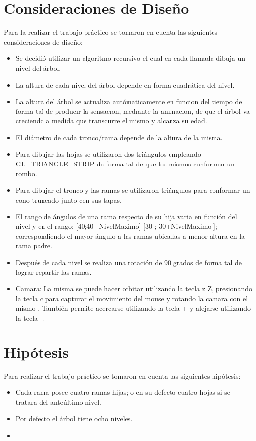 \documentclass[11pt]{article}
\begin{document}
\section{Consideraciones de Dise\~no}
  Para la realizar el trabajo pr\'actico se tomaron en cuenta las siguientes consideraciones de dise\~no:
\begin{itemize}
 \item Se decidi\'o utilizar un algoritmo recursivo el cual en cada llamada dibuja un nivel del \'arbol.
 \item La altura de cada nivel del \'arbol depende en forma cuadr\'atica del nivel.
 \item La altura del \'arbol se actualiza aut\'omaticamente en funcion del tiempo de forma tal de producir la sensacion, mediante la animacion, 
de que el \'arbol va creciendo a medida que transcurre el mismo y alcanza su edad.
 \item El di\'ametro de cada tronco/rama depende de la altura de la misma.
 \item Para dibujar las hojas se utilizaron dos tri\'angulos empleando GL\_TRIANGLE\_STRIP de forma tal de que los mismos conformen un rombo.
 \item Para dibujar el tronco y las ramas se utilizaron  tri\'angulos para conformar un cono truncado junto con sus tapas.
 \item El rango de \'angulos de una rama respecto de su hija varia en funci\'on del nivel y en el rango: [40;40+NivelMaximo] [30 ; 30+NivelMaximo ]; correspondiendo
 el mayor \'angulo a las ramas ubicadas a menor altura en la rama padre.
 \item Despu\'es de cada nivel se realiza una rotaci\'on de 90 grados de forma tal de lograr repartir las ramas.
 \item Camara: La misma se puede hacer orbitar utilizando la tecla z Z, presionando la tecla c para capturar el movimiento del mouse y rotando la camara con el mismo
 . Tambi\'en permite acercarse utilizando la tecla + y alejarse utilizando la tecla -.
\end{itemize}



\section{Hip\'otesis}
Para realizar el trabajo pr\'actico se tomaron en cuenta las siguientes hip\'otesis:
\begin{itemize}
 \item Cada rama posee cuatro ramas hijas; o en su defecto cuatro hojas si se tratara del ante\'ultimo nivel.
 \item Por defecto el \'arbol tiene ocho niveles.
 \item 
\end{itemize}
\end{document}
